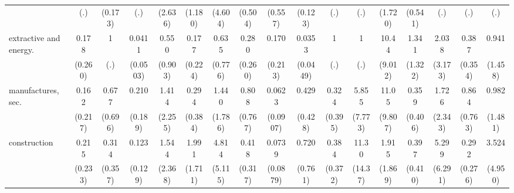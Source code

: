 {\begin{tabular}{l*{16}{c}}
                    &         (.)         &     (0.173)         &         (.)         &     (2.636)         &     (1.180)         &     (4.604)         &     (0.504)         &     (0.557)         &     (0.123)         &         (.)         &         (.)         &     (1.720)         &     (0.541)         &         (.)         &         (.)         &         (.)         \\
[1em]
extractive and energy.&       0.178         &           1         &      0.0411\sym{**} &       0.550         &       0.177         &       0.635         &       0.280         &       0.170         &      0.0353\sym{**} &           1         &           1         &       10.44\sym{**} &       1.341         &       2.038         &       0.387         &       0.941         \\
                    &     (0.260)         &         (.)         &    (0.0503)         &     (0.903)         &     (0.224)         &     (0.776)         &     (0.260)         &     (0.213)         &    (0.0449)         &         (.)         &         (.)         &     (9.012)         &     (1.322)         &     (3.173)         &     (0.354)         &     (1.458)         \\
[1em]
manufactures, sec.  &       0.162         &       0.677         &       0.210         &       1.414         &       0.294         &       1.440         &       0.808         &      0.0623         &       0.429         &       0.324         &       5.855         &       11.05\sym{**} &       0.359         &       1.726         &       0.864         &       0.982         \\
                    &     (0.217)         &     (0.696)         &     (0.189)         &     (2.255)         &     (0.384)         &     (1.786)         &     (0.767)         &    (0.0907)         &     (0.428)         &     (0.395)         &     (7.773)         &     (9.807)         &     (0.406)         &     (2.343)         &     (0.763)         &     (1.481)         \\
[1em]
construction        &       0.215         &       0.314         &       0.123\sym{*}  &       1.544         &       1.991         &       4.814         &       0.418         &      0.0739\sym{*}  &       0.720         &       0.384         &       11.30         &       1.915         &       0.397         &       5.299         &       0.292         &       3.524         \\
                    &     (0.233)         &     (0.357)         &     (0.129)         &     (2.368)         &     (1.711)         &     (5.115)         &     (0.317)         &    (0.0879)         &     (0.761)         &     (0.372)         &     (14.37)         &     (1.869)         &     (0.410)         &     (6.291)         &     (0.276)         &     (4.950)         \\

\end{tabular}}
